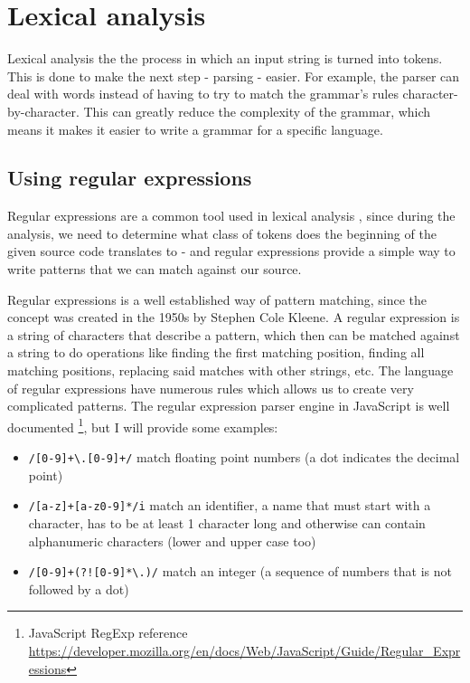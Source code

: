 \chapter{Lexical analysis}\label{sect:Lexing}
Lexical analysis the the process in which an input string is turned into tokens. This is done to make the next step - parsing - easier. For example, the parser can deal with words instead of having to try to match the grammar's rules character-by-character. This can greatly reduce the complexity of the grammar, which means it makes it easier to write a grammar for a specific language.
\section{Using regular expressions}
Regular expressions are a common tool used in lexical analysis \cite{Lex}, since during the analysis, we need to determine what class of tokens does the beginning of the given source code translates to - and regular expressions provide a simple way to write patterns that we can match against our source.

Regular expressions is a well established way of pattern matching, since the concept was created in the 1950s by Stephen Cole Kleene. A regular expression is a string of characters that describe a pattern, which then can be matched against a string to do operations like finding the first matching position, finding all matching positions, replacing said matches with other strings, etc. The language of regular expressions have numerous rules which allows us to create very complicated patterns. The regular expression parser engine in JavaScript is well documented \footnote{JavaScript RegExp reference \url{https://developer.mozilla.org/en/docs/Web/JavaScript/Guide/Regular_Expressions}}, but I will provide some examples:
\begin{itemize}
\item \texttt{/[0-9]+\textbackslash.[0-9]+/} match floating point numbers (a dot indicates the decimal point)
\item \texttt{/[a-z]+[a-z0-9]*/i} match an identifier, a name that must start with a character, has to be at least 1 character long and otherwise can contain alphanumeric characters (lower and upper case too)
\item \texttt{/[0-9]+(?![0-9]*\textbackslash.)/} match an integer (a sequence of numbers that is not followed by a dot)
\end{itemize}

